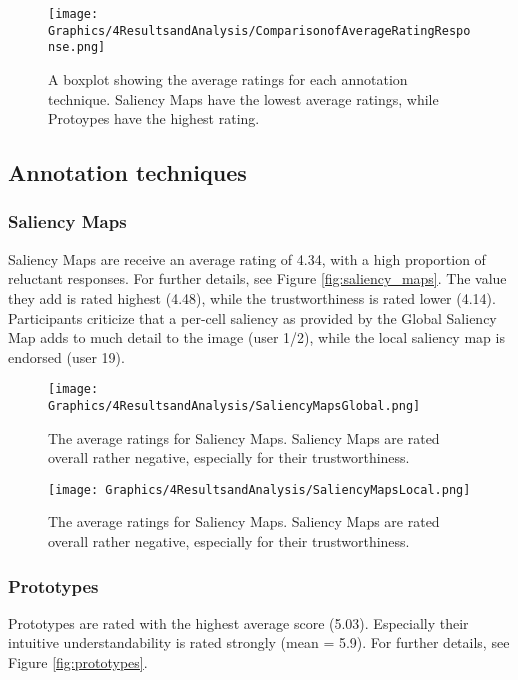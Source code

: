\begin{figure}
    \centering
    \texttt{[image: Graphics/4ResultsandAnalysis/ComparisonofAverageRatingResponse.png]}
    \caption{A boxplot showing the average ratings for each annotation technique. Saliency Maps have the lowest average ratings, while Protoypes have the highest rating.}
    \label{fig:comparison}
\end{figure}


\subsection{Annotation techniques}
\subsubsection{Saliency Maps}

Saliency Maps are receive an average rating of 4.34, with a high proportion of reluctant responses. For further details, see Figure \ref{fig:saliency_maps}. The value they add is rated highest (4.48), while the trustworthiness is rated lower (4.14). Participants criticize that a per-cell saliency as provided by the Global Saliency Map adds to much detail to the image (user 1/2), while the local saliency map is endorsed (user 19).

\begin{figure*}
    \centering
    \texttt{[image: Graphics/4ResultsandAnalysis/SaliencyMapsGlobal.png]}
    \caption{The average ratings for Saliency Maps. Saliency Maps are rated overall rather negative, especially for their trustworthiness.}
    \label{fig:saliencymaps_global}
\end{figure*}

\begin{figure*}
    \centering
    \texttt{[image: Graphics/4ResultsandAnalysis/SaliencyMapsLocal.png]}
    \caption{The average ratings for Saliency Maps. Saliency Maps are rated overall rather negative, especially for their trustworthiness.}
    \label{fig:saliencymaps_local}
\end{figure*}

\subsubsection{Prototypes}
Prototypes are rated with the highest average score (5.03). Especially their intuitive understandability is rated strongly (mean = 5.9). For further details, see Figure \ref{fig:prototypes}.

